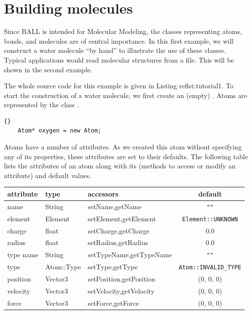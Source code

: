 \section{Building molecules}

Since BALL is intended for Molecular Modeling, the classes representing atoms,
bonds, and molecules are of central importance. In this first example, we will
construct a water molecule ``by hand'' to illustrate the use of these classes.
Typical applications would read molecular structures from a file. This will be
shown in the second example.

\noindent
The whole source code for this example is given in Listing ref{lst:tutorial1}.
To start the construction of a water molecule, we first create an (empty)
. Atoms are represented by the class .

\begin{lstlisting}{}
	Atom* oxygen = new Atom;
\end{lstlisting}
	
\noindent
Atoms have a number of attributes. As we created this atom without specifying
any of its properties, these attributes are set to their defaults. The
following table lists the attributes of an atom along with its
 (methods to access or modify an attribute) and default
values.
\begin{center}
	\begin{tabular}{lllc}
	attribute		&	type				& accessors     						& default\\
	\hline
	name				& String			& setName,getName						& {\tt ""}\\
	element			& Element			& setElement,getElement			& {\tt Element::UNKNOWN}\\
	charge			& float				& setCharge,getCharge				& 0.0\\
	radius			& float				& setRadius,getRadius				& 0.0\\
	type name   & String			& setTypeName,getTypeName		& {\tt ""}\\
	type        & Atom::Type	& setType,getType						& {\tt Atom::INVALID\_TYPE}\\
	position    & Vector3			& setPosition,getPosition		& (0, 0, 0)\\
	velocity    & Vector3			& setVelocity,getVelocity		& (0, 0, 0)\\
	force		    & Vector3			& setForce,getForce					& (0, 0, 0)
	\end{tabular}
\end{center}

